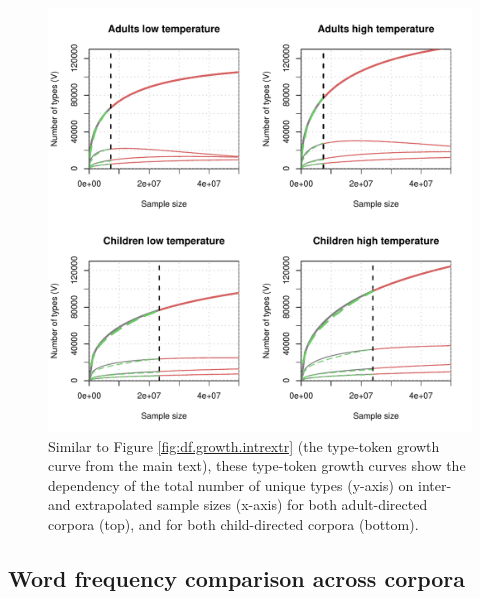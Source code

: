 \documentclass[doc, a4paper, anonymous]{apa7}
\begin{document}
\begin{figure}[!htbp]
    \includegraphics[width = .8\paperwidth]{figures/vgc_plots_grid.pdf}
    \caption{Similar to Figure \ref{fig:df.growth.intrextr} (the type-token growth curve from the main text), these type-token growth curves show the dependency of the total number of unique types (y-axis) on inter- and extrapolated sample sizes (x-axis) for both adult-directed corpora (top), and for both child-directed corpora (bottom).}
    \label{fig:df.growth.intrextr2}
  \hfill
\end{figure}

\clearpage  


\subsection{Word frequency comparison across corpora}
\end{document}
